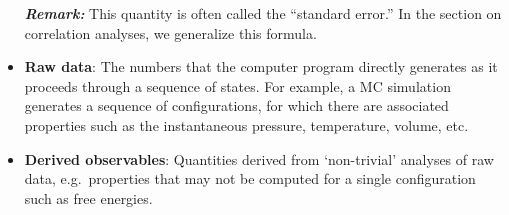 \begin{itemize}
  
  

\smallskip
\textbf{\textit{Remark:}} This quantity is often called the ``standard error.''  In the section on correlation analyses, we generalize this formula.


  
\item {\bf Raw data}: The numbers that the computer program directly generates as it proceeds through a sequence of states.
For example, a MC simulation generates a sequence of configurations, for which there are associated properties such as the instantaneous pressure, temperature, volume, etc.
\label{def:raw_data}
\item {\bf Derived observables}: Quantities derived from `non-trivial' analyses of raw data, e.g.\ properties that may not be computed for a single configuration such as free energies.
  \label{def:deriv_obs}
  
  



\end{itemize}
